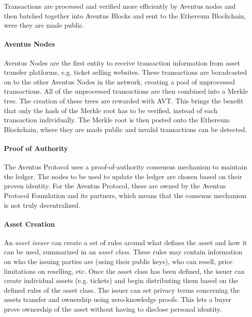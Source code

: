 Transactions are processed and verified more efficiently by Aventus nodes and then batched together into Aventus Blocks and sent to the Ethereum Blockchain, were they are made public.

\paragraph{Aventus Nodes}

Aventus Nodes are the first entity to receive transaction information from asset transfer platforms, e.g. ticket selling websites. These transactions are boradcasted on to the other Aventus Nodes in the network, creating a pool of unprocessed transactions. All of the unprocessed transactions are then combined into a Merkle tree. The creation of these trees are rewarded with AVT. This brings the benefit that only the hash of the Merkle root has to be verified, instead of each transaction individually. The Merkle root is then posted onto the Ethereum Blockchain, where they are made public and invalid transactions can be detected.

\paragraph{Proof of Authority}

The Aventus Protocol uses a proof-of-authority consensus mechanism to maintain the ledger. The nodes to be used to update the ledger are chosen based on their proven identity. For the Aventus Protocol, these are owned by the Aventus Protocol Foundation and its partners, which means that the consenus mechanism is not truly decentralized. 

\paragraph{Asset Creation}

An \textit{asset issuer} can create a set of rules around what defines the asset and how it can be used, summarized in an \textit{asset class}. These rules may contain information on who the issuing parties are (using their public keys), who can resell, price limitations on reselling, etc. Once the asset class has been defined, the issuer can create individual assets (e.g. tickets) and begin distributing them based on the defined rules of the asset class. The issuer can set privacy terms concerning the assets transfer and ownership using zero-knowledge proofs. This lets a buyer prove ownership of the asset without having to disclose personal identity.

